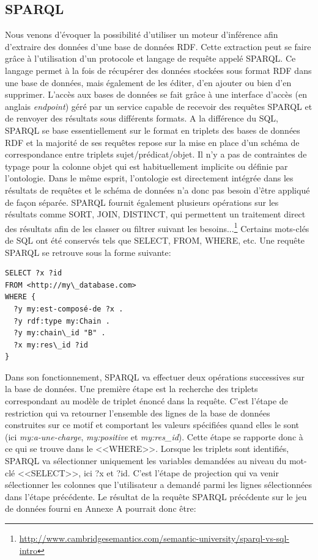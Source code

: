 \subsection{SPARQL} \label{sparql}

Nous venons d'évoquer la possibilité d'utiliser un moteur d'inférence afin d'extraire des données d'une base de données RDF. Cette extraction peut se faire grâce à l'utilisation d'un protocole et langage de requête appelé SPARQL. Ce langage permet à la fois de récupérer des données stockées sous format RDF dans une base de données, mais également de les éditer, d'en ajouter ou bien d'en supprimer. L'accès aux bases de données se fait grâce à une interface d'accès (en anglais \textit{endpoint}) géré par un service capable de recevoir des requêtes SPARQL et de renvoyer des résultats sous différents formats.
A la différence du SQL, SPARQL se base essentiellement sur le format en triplets des bases de données RDF et la majorité de ses requêtes repose sur la mise en place d'un schéma de correspondance entre triplets sujet/prédicat/objet. Il n'y a pas de contraintes de typage pour la colonne objet qui est habituellement implicite ou définie par l'ontologie. Dans le même esprit, l'ontologie est directement intégrée dans les résultats de requêtes et le schéma de données n'a donc pas besoin d'être appliqué de façon séparée. SPARQL fournit également plusieurs opérations sur les résultats comme SORT, JOIN, DISTINCT, qui permettent un traitement direct des résultats afin de les classer ou filtrer suivant les besoins...\footnote{\url{http://www.cambridgesemantics.com/semantic-university/sparql-vs-sql-intro}} Certains mots-clés de SQL ont été conservés tels que SELECT, FROM, WHERE, etc.
Une requête SPARQL se retrouve sous la forme suivante:

\begin{lstlisting}[language=SPARQL]
SELECT ?x ?id
FROM <http://my\_database.com> 
WHERE {
  ?y my:est-composé-de ?x .
  ?y rdf:type my:Chain .
  ?y my:chain\_id "B" .
  ?x my:res\_id ?id
}
\end{lstlisting}

Dans son fonctionnement, SPARQL va effectuer deux opérations successives sur la base de données. Une première étape est la recherche des triplets correspondant au modèle de triplet énoncé dans la requête. C'est l'étape de restriction qui va retourner l'ensemble des lignes de la base de données construites sur ce motif et comportant les valeurs spécifiées quand elles le sont (ici \textit{my:a-une-charge}, \textit{my:positive} et \textit{my:res\_id}). Cette étape se rapporte donc à ce qui se trouve dans le <<WHERE>>. Lorsque les triplets sont identifiés, SPARQL va sélectionner uniquement les variables demandées au niveau du mot-clé <<SELECT>>, ici ?x et ?id. C'est l'étape de projection qui va venir sélectionner les colonnes que l'utilisateur a demandé parmi les lignes sélectionnées dans l'étape précédente. Le résultat de la requête SPARQL précédente sur le jeu de données fourni en Annexe A pourrait donc être:

